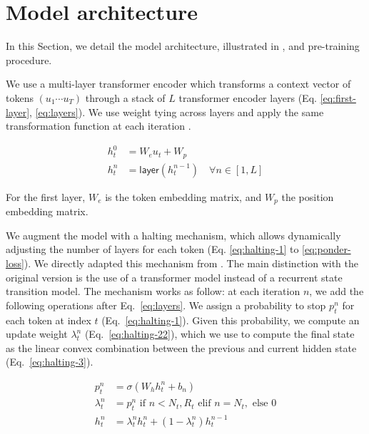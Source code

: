 \section{Model architecture}

In this Section, we detail the model architecture, illustrated in , and pre-training procedure.

We use a multi-layer transformer encoder \parencite{devlin_19} which transforms a context vector of tokens $(u_1 \cdots u_{T})$ through a stack of $L$ transformer encoder layers (Eq. \ref{eq:first-layer}, \ref{eq:layers}). 
We use weight tying across layers and apply the same transformation function at each iteration \parencite{lan_20}.

\begin{align}
    h^0_t &= W_eu_t + W_p \label{eq:first-layer}\\
    h^n_t &= \mathsf{layer}(h^{n-1}_t) \quad \forall n \in [1, L] \label{eq:layers}
\end{align}

For the first layer, $W_e$ is the token embedding matrix, and $W_p$ the position embedding matrix. 

We augment the model with a halting mechanism, which allows dynamically adjusting the number of layers for each token (Eq. \ref{eq:halting-1} to \ref{eq:ponder-loss}). We directly adapted this mechanism from \textcite{graves_16}. The main distinction with the original version is the use of a transformer model instead of a recurrent state transition model. The mechanism works as follow: at each iteration $n$, we add the following operations after Eq.~\ref{eq:layers}. We assign a probability to stop $p^n_t$ for each token at index $t$ (Eq.~\ref{eq:halting-1}). 
Given this probability, we compute an update weight $\lambda^n_t$ (Eq.~\ref{eq:halting-22}), which we use to compute the final state as the linear convex combination between the previous and current hidden state (Eq.~\ref{eq:halting-3}). 


\begin{align}
    p^n_t &= \sigma\left(W_hh^n_t+b_n\right) \label{eq:halting-1}\\
    \lambda^n_t &=  p^n_t \text{ if } n < N_t, R_t \text{ elif } n = N_t, \text{ else } 0 \label{eq:halting-22}\\
    h^n_t &= \lambda^n_th^n_t + (1-\lambda^n_t)h^{n-1}_t \label{eq:halting-3}
\end{align}

